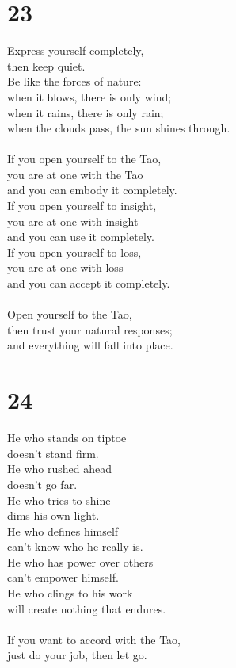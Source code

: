 \documentclass[b5paper, 12pt, oneside]{book}
\begin{document}
\chapter*{23}
Express yourself completely,\\
then keep quiet.\\
Be like the forces of nature:\\
when it blows, there is only wind;\\
when it rains, there is only rain;\\
when the clouds pass, the sun shines through.\\
\\
If you open yourself to the Tao,\\
you are at one with the Tao\\
and you can embody it completely.\\
If you open yourself to insight,\\
you are at one with insight\\
and you can use it completely.\\
If you open yourself to loss,\\
you are at one with loss\\
and you can accept it completely.\\
\\
Open yourself to the Tao,\\
then trust your natural responses;\\
and everything will fall into place.\\

\chapter*{24}
He who stands on tiptoe\\
doesn't stand firm.\\
He who rushed ahead\\
doesn't go far.\\
He who tries to shine\\
dims his own light.\\
He who defines himself\\
can't know who he really is.\\
He who has power over others\\
can't empower himself.\\
He who clings to his work\\
will create nothing that endures.\\
\\
If you want to accord with the Tao,\\
just do your job, then let go.\\
\end{document}

